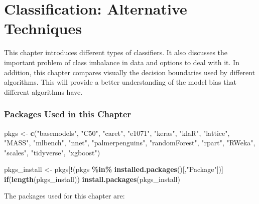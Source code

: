 \documentclass[
  notitlepage]{book}
\newenvironment{Shaded}{\begin{snugshade}}{\end{snugshade}}
\newcommand{\ControlFlowTok}[1]{\textcolor[rgb]{0.13,0.29,0.53}{\textbf{#1}}}
\newcommand{\KeywordTok}[1]{\textcolor[rgb]{0.13,0.29,0.53}{\textbf{#1}}}
\newcommand{\NormalTok}[1]{#1}
\newcommand{\OperatorTok}[1]{\textcolor[rgb]{0.81,0.36,0.00}{\textbf{#1}}}
\newcommand{\StringTok}[1]{\textcolor[rgb]{0.31,0.60,0.02}{#1}}
\begin{document}
\hypertarget{classification-alternative-techniques}{%
\chapter{Classification: Alternative Techniques}\label{classification-alternative-techniques}}

This chapter introduces different types of classifiers. It also
discusses the important problem of class imbalance in data and options
to deal with it. In addition, this chapter compares visually the
decision boundaries used by different algorithms. This will provide a
better understanding of the model bias that different algorithms have.

\hypertarget{packages-used-in-this-chapter-2}{%
\subsection*{Packages Used in this Chapter}\label{packages-used-in-this-chapter-2}}

\begin{Shaded}
\begin{Highlighting}[]
\NormalTok{pkgs \textless{}{-}}\StringTok{ }\KeywordTok{c}\NormalTok{(}\StringTok{"basemodels"}\NormalTok{, }\StringTok{"C50"}\NormalTok{, }\StringTok{"caret"}\NormalTok{, }\StringTok{"e1071"}\NormalTok{, }\StringTok{"keras"}\NormalTok{, }\StringTok{"klaR"}\NormalTok{, }
          \StringTok{"lattice"}\NormalTok{, }\StringTok{"MASS"}\NormalTok{, }\StringTok{"mlbench"}\NormalTok{, }\StringTok{"nnet"}\NormalTok{, }\StringTok{"palmerpenguins"}\NormalTok{, }
          \StringTok{"randomForest"}\NormalTok{, }\StringTok{"rpart"}\NormalTok{, }\StringTok{"RWeka"}\NormalTok{, }\StringTok{"scales"}\NormalTok{, }\StringTok{"tidyverse"}\NormalTok{, }
          \StringTok{"xgboost"}\NormalTok{)}

\NormalTok{pkgs\_install \textless{}{-}}\StringTok{ }\NormalTok{pkgs[}\OperatorTok{!}\NormalTok{(pkgs }\OperatorTok{\%in\%}\StringTok{ }\KeywordTok{installed.packages}\NormalTok{()[,}\StringTok{"Package"}\NormalTok{])]}
\ControlFlowTok{if}\NormalTok{(}\KeywordTok{length}\NormalTok{(pkgs\_install)) }\KeywordTok{install.packages}\NormalTok{(pkgs\_install)}
\end{Highlighting}
\end{Shaded}

The packages used for this chapter are:
\end{document}
